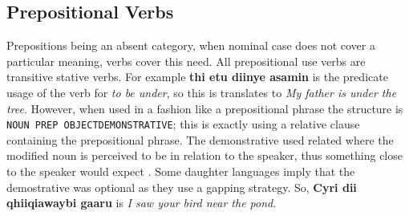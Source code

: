 \subsection{Prepositional Verbs}
Prepositions being an absent category, when nominal case does not cover a particular meaning, verbs cover this need. All prepositional use verbs are transitive stative verbs. For example \textbf{thi etu diinye asamin} is the predicate usage of the verb for \textit{to be under}, so this is translates to \textit{My father is under the tree}. However, when used in a fashion like a prepositional phrase the structure is \texttt{NOUN PREP OBJECT\acc\space DEMONSTRATIVE\gen}; this is exactly using a relative clause containing the prepositional phrase. The demonstrative used related where the modified noun is perceived to be in relation to the speaker, thus something close to the speaker would expect \textbf{\proxdem\gen}. Some daughter languages imply that the demostrative was optional as they use a gapping strategy. So, \textbf{Cyri dii qhiiqi\acc\space awa\gen\space ybi gaaru\acc\space \distdem\gen} is \textit{I saw your bird near the pond}.
